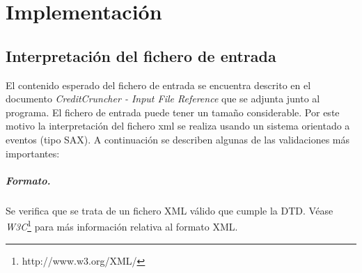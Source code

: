 
%
%
%
%
%
%
%
%

\chapter{Implementaci\'on}
\label{sec:implementation}


\section{Interpretaci\'on del fichero de entrada}

El contenido esperado del fichero de entrada se encuentra
descrito en el documento \emph{CreditCruncher - Input File Reference}
que se adjunta junto al programa.
\newline
\newline
El fichero de entrada puede tener un tama\~no considerable. Por
este motivo la interpretaci\'on del fichero xml se realiza usando un
sistema orientado a eventos (tipo SAX). A continuaci\'on se
describen algunas de las validaciones m\'as importantes:

\paragraph{Formato.} Se verifica que se trata de un fichero XML
v\'alido que cumple la DTD. V\'ease \emph{W3C}\footnote{http://www.w3.org/XML/}
para m\'as informaci\'on relativa al formato XML.

